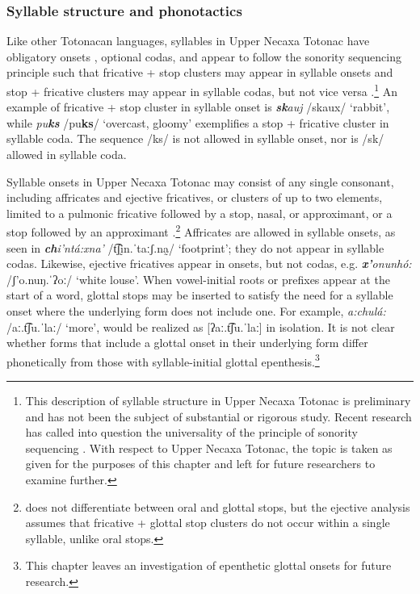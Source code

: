 \documentclass[output=paper,colorlinks,citecolor=brown]{langscibook}
\begin{document}
\subsubsection{Syllable structure and phonotactics} \label{subsection:syllables}
Like other Totonacan languages, syllables in Upper Necaxa Totonac have obligatory onsets \citep{Kung2007,McFarland2009,Watters1980,Mackay1994}, optional codas, and appear to follow the sonority sequencing principle such that fricative + stop clusters may appear in syllable onsets and stop + fricative clusters may appear in syllable codas, but not vice versa \citep{Kirchner2002,Beck2004}.\footnote{This description of syllable structure in Upper Necaxa Totonac is preliminary and has not been the subject of substantial or rigorous study. Recent research has called into question the universality of the principle of sonority sequencing \citep{Yin2023}. With respect to Upper Necaxa Totonac, the topic is taken as given for the purposes of this chapter and left for future researchers to examine further.} An example of fricative + stop cluster in syllable onset is \textit{\textbf{sk}auj} {/skaux/} `rabbit', while \textit{pu\textbf{ks}} {/pu\textbf{ks}/} `overcast, gloomy' exemplifies a stop + fricative cluster in syllable coda. The sequence /ks/ is not allowed in syllable onset, nor is /sk/ allowed in syllable coda.

Syllable onsets in Upper Necaxa Totonac may consist of any single consonant, including affricates and ejective fricatives, or clusters of up to two elements, limited to a pulmonic fricative followed by a stop, nasal, or approximant, or a stop followed by an approximant \citep{Kirchner2002}.\footnote{\citet{Kirchner2002} does not differentiate between oral and glottal stops, but the ejective analysis assumes that fricative + glottal stop clusters do not occur within a single syllable, unlike oral stops.} Affricates are allowed in syllable onsets, as seen in \textit{\textbf{ch}i'ntá:xna'} {/t͡ʃḭn.ˈtaːʃ.na̰/} `footprint'; they do not appear in syllable codas. Likewise, ejective fricatives appear in onsets, but not codas, e.g. \textit{\textbf{x'}onunhó:} {/ʃ'o.nuŋ.ˈʔoː/} `white louse'. When vowel-initial roots or prefixes appear at the start of a word, glottal stops may be inserted to satisfy the need for a syllable onset where the underlying form does not include one. For example, \textit{a:chulá:} {/aː.t͡ʃu.ˈlaː/} `more', would be realized as {[ʔaː.t͡ʃu.ˈlaː]} in isolation. It is not clear whether forms that include a glottal onset in their underlying form differ phonetically from those with syllable-initial glottal epenthesis.\footnote{This chapter leaves an investigation of epenthetic glottal onsets for future research.}
\end{document}

